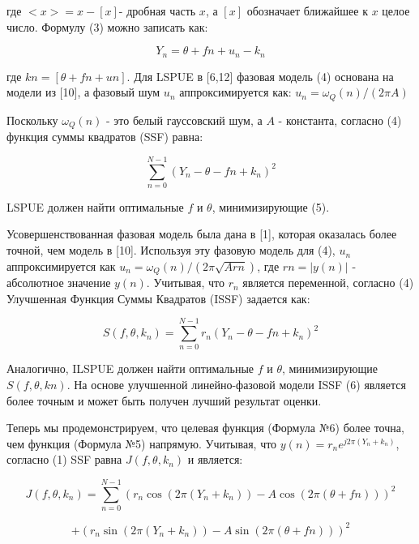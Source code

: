где $<x> = x - [x]$- дробная часть $x$, а $[x]$ обозначает ближайшее к $x$ целое число. Формулу (3) можно записать как:

\begin{equation}
\label{eq:equation1.44}	
	Y_n= \theta+fn+u_n-k_n
\end{equation}

где $kn =[\theta + fn + un]$. Для LSPUE в [6,12] фазовая модель (4) основана на модели из [10], а фазовый шум $u_n$ аппроксимируется как: $u_n= \omega_Q(n)/(2 \pi A)$

Поскольку $\omega_Q(n)$ - это белый гауссовский шум, а $A$ - константа, согласно (4) функция суммы квадратов (SSF) равна:

\begin{equation}
\label{eq:equation1.45}		
	\sum_{n=0}^{N-1} (Y_n- \theta -fn +k_n)^2
\end{equation}

LSPUE  должен найти оптимальные $f$ и $\theta$, минимизирующие (5).

Усовершенствованная фазовая модель была дана в [1], которая оказалась более точной, чем модель в [10]. Используя эту фазовую модель для (4), $u_n$ аппроксимируется как $u_n = \omega_Q(n)/(2 \pi \sqrt{Arn})$, где $rn = | y (n) |$ - абсолютное значение $y(n)$. Учитывая, что $r_n$ является переменной, согласно (4) Улучшенная Функция Суммы Квадратов (ISSF) задается как:

\begin{equation}
\label{eq:equation1.46}	
	S(f, \theta, k_n) = \sum_{n=0}^{N-1} r_n (Y_n- \theta -fn +k_n)^2
\end{equation}

Аналогично, ILSPUE должен найти оптимальные $f$ и $\theta$, минимизирующие $S (f, \theta, kn)$. На основе улучшенной линейно-фазовой модели ISSF (6) является более точным и может быть получен лучший результат оценки.

Теперь мы продемонстрируем, что целевая функция (Формула №6) более точна, чем функция (Формула №5) напрямую. Учитывая, что $y(n) = r_ne^{ j2\pi (Y_n + k_n)}$, согласно (1) SSF равна $J(f, \theta, k_n)$ и является:

$$
J (f, \theta, k_n) = \sum_{n=0}^{N-1} (r_n \cos(2 \pi (Y_n+k_n)) -A\cos(2 \pi(\theta+fn)))^2
$$

\begin{equation}
\label{eq:equation1.47}		
	+(r_n \sin(2\pi(Y_n+k_n))-A\sin(2\pi(\theta+fn)))^2 
\end{equation}

